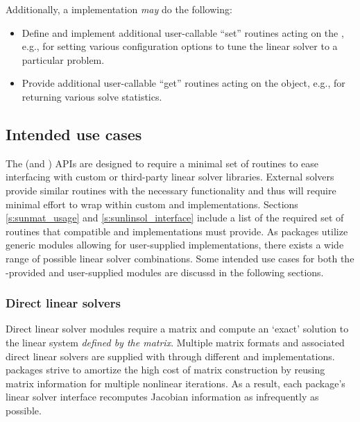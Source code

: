 Additionally, a {\sunlinsol} implementation \emph{may} do the
following:
\begin{itemize}
\item Define and implement additional user-callable ``set'' routines
  acting on the , e.g., for setting various
  configuration options to tune the linear solver to a
  particular problem.
\item Provide additional user-callable ``get'' routines acting on the
   object, e.g., for returning various solve
  statistics.
\end{itemize}

\subsection{Intended use cases}\label{ss:sunlinsol_intended}

The {\sunlinsol} (and {\sunmatrix}) APIs are designed to require a minimal set
of routines to ease interfacing with custom or third-party linear solver
libraries. External solvers provide similar routines with
the necessary functionality and thus will require minimal effort to wrap within
custom {\sunmatrix} and {\sunlinsol} implementations. Sections
\ref{s:sunmat_usage} and \ref{s:sunlinsol_interface} include a list of the required set
of routines that compatible {\sunmatrix} and {\sunlinsol} implementations must
provide. As {\sundials} packages utilize generic {\sunlinsol} modules allowing
for user-supplied  implementations, there exists a wide
range of possible linear solver combinations. Some intended use cases for both
the {\sundials}-provided and user-supplied {\sunlinsol} modules are discussd in
the following sections.

\subsubsection*{Direct linear solvers}

Direct linear solver modules require a matrix and compute an `exact' solution to
the linear system \textit{defined by the matrix}. Multiple matrix formats and
associated direct linear solvers are supplied with {\sundials} through different
{\sunmatrix} and {\sunlinsol} implementations. {\sundials} packages strive to
amortize the high cost of matrix construction by reusing matrix information for
multiple nonlinear iterations. As a result, each package's linear solver
interface recomputes Jacobian information as infrequently as possible.

